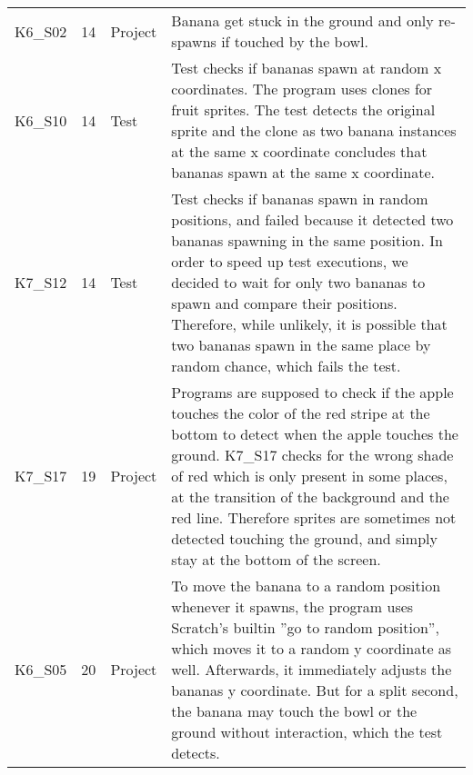 \begin{table}[htpb]
{\begin{tabular}{lrlp{11.25cm}}
        K6\_S02 & 14   & Project & Banana get stuck in the ground and only re-spawns if touched by the bowl. \\
        K6\_S10 & 14   & Test    & Test checks if bananas spawn at random x coordinates.
                                   The program uses clones for fruit sprites.
                                   The test detects the original sprite and the clone as two banana instances at the same x coordinate concludes that bananas spawn at the same x coordinate. \\
        K7\_S12 & 14   & Test    & Test checks if bananas spawn in random positions, and failed because it detected two bananas spawning in the same position.
                                   In order to speed up test executions, we decided to wait for only two bananas to spawn and compare their positions.
                                   Therefore, while unlikely, it is possible that two bananas spawn in the same place by random chance, which fails the test. \\

        K7\_S17 & 19   & Project & Programs are supposed to check if the apple touches the color of the red stripe at the bottom to detect when the apple touches the ground.
                                   K7\_S17 checks for the wrong shade of red which is only present in some places, at the transition of the background and the red line.
                                   Therefore sprites are sometimes not detected touching the ground, and simply stay at the bottom of the screen. \\

        K6\_S05 & 20   & Project & To move the banana to a random position whenever it spawns,
                                   the program uses Scratch's builtin ''go to random position'', which moves it to a random y coordinate as well.
                                   Afterwards, it immediately adjusts the bananas y coordinate.
                                   But for a split second, the banana may touch the bowl or the ground without interaction, which the test detects. \\


\end{tabular}}
\end{table}
